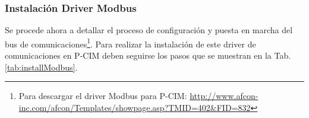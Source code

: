 \subsubsection{Instalación Driver Modbus}
Se procede ahora a detallar el proceso de configuración y puesta en marcha
del bus de comunicaciones\footnote{Para descargar el driver Modbus para P-CIM:
\url{http://www.afcon-inc.com/afcon/Templates/showpage.asp?TMID=402&FID=832}}.
Para realizar la instalación de este driver de comunicaciones en P-CIM deben
seguirse los pasos que se muestran en la Tab. \ref{tab:installModbus}.
